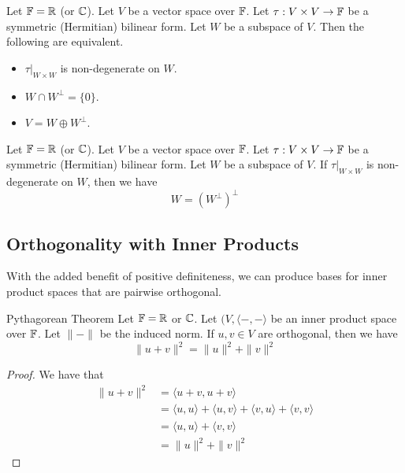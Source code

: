 \documentclass[a4paper]{article}
\begin{document}
\begin{prp}{}{} Let $\mathbb{F}=\mathbb{R}$ (or $\mathbb{C}$). Let $V$ be a vector space over $\mathbb{F}$. Let $\tau:V\times V\to\mathbb{F}$ be a symmetric (Hermitian) bilinear form. Let $W$ be a subspace of $V$. Then the following are equivalent. 
\begin{itemize}
\item $\tau|_{W\times W}$ is non-degenerate on $W$. 
\item $W\cap W^\perp=\{0\}$. 
\item $V=W\oplus W^\perp$. 
\end{itemize}
\end{prp}

\begin{prp}{}{} Let $\mathbb{F}=\mathbb{R}$ (or $\mathbb{C}$). Let $V$ be a vector space over $\mathbb{F}$. Let $\tau:V\times V\to\mathbb{F}$ be a symmetric (Hermitian) bilinear form. Let $W$ be a subspace of $V$. If $\tau|_{W\times W}$ is non-degenerate on $W$, then we have $$W=(W^\perp)^\perp$$
\end{prp}

\subsection{Orthogonality with Inner Products}
With the added benefit of positive definiteness, we can produce bases for inner product spaces that are pairwise orthogonal. 

\begin{thm}{Pythagorean Theorem}{} Let $\mathbb{F}=\mathbb{R}$ or $\mathbb{C}$. Let $(V,\langle-,-\rangle$ be an inner product space over $\mathbb{F}$. Let $\|-\|$ be the induced norm. If $u,v\in V$ are orthogonal, then we have $$\|u+v\|^2=\|u\|^2+\|v\|^2$$ 
\begin{proof}
We have that 
\begin{align*}
\|u+v\|^2&=\langle u+v,u+v\rangle\\
&=\langle u,u\rangle+\langle u,v\rangle+\langle v,u\rangle+\langle v,v\rangle\\
&=\langle u,u\rangle+\langle v,v\rangle\\
&=\|u\|^2+\|v\|^2
\end{align*}
\end{proof}
\end{thm}
\end{document}
